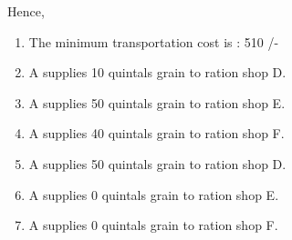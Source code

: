 \documentclass[journal,10pt,twocolumn]{article}
\begin{document}
Hence,
\begin{enumerate}
\item The minimum transportation cost is : 510 /-
\item A supplies 10 quintals grain to ration shop D.
\item A supplies 50 quintals grain to ration shop E.
\item A supplies 40 quintals grain to ration shop F.
\item A supplies 50 quintals grain to ration shop D.
\item A supplies 0 quintals grain to ration shop E.
\item A supplies 0 quintals grain to ration shop F.
\end{enumerate}
\end{document}
